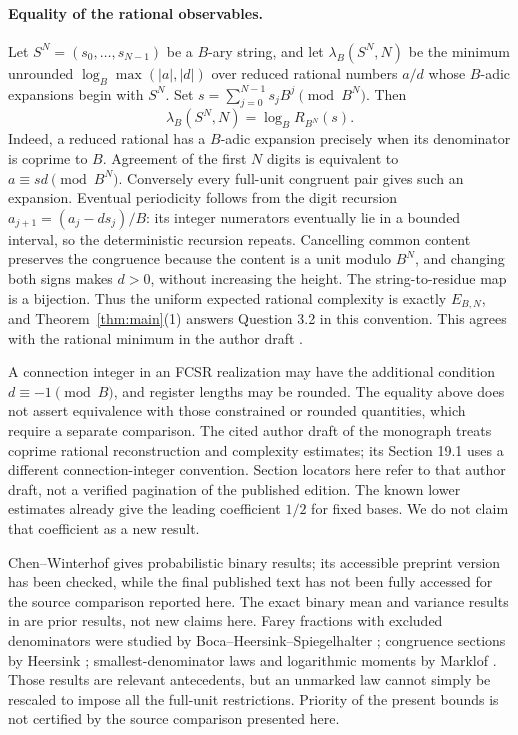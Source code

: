 \documentclass[11pt]{article}
\theoremstyle{definition}\newtheorem{definition}[theorem]{Definition}
\theoremstyle{remark}\newtheorem{remark}[theorem]{Remark}
\begin{document}
\paragraph{Equality of the rational observables.}
Let \(S^N=(s_0,\ldots,s_{N-1})\) be a \(B\)-ary string, and let
\(\lambda_B(S^N,N)\) be the minimum unrounded \(\log_B\max(|a|,|d|)\)
over reduced rational numbers \(a/d\) whose \(B\)-adic expansions begin
with \(S^N\). Set \(s=\sum_{j=0}^{N-1}s_jB^j\pmod{B^N}\).
Then
\[
 \lambda_B(S^N,N)=\log_B R_{B^N}(s).
\]
Indeed, a reduced rational has a \(B\)-adic expansion precisely when its
denominator is coprime to \(B\). Agreement of the first \(N\) digits is equivalent to
\(a\equiv sd\pmod{B^N}\). Conversely every full-unit congruent pair gives
such an expansion. Eventual periodicity follows from the digit recursion
\(a_{j+1}=(a_j-ds_j)/B\): its integer numerators eventually lie in a
bounded interval, so the deterministic recursion repeats.
Cancelling common content preserves the congruence
because the content is a unit modulo \(B^N\), and changing both signs makes
\(d>0\), without increasing the height. The string-to-residue map is a
bijection. Thus the uniform expected rational complexity is exactly
\(E_{B,N}\), and Theorem~\ref{thm:main}(1) answers Question 3.2 in this
convention. This agrees with the rational minimum in the author draft
\cite[Section 21.5]{GK}.

A connection integer in an FCSR realization may have the additional
condition \(d\equiv-1\pmod B\), and register lengths may be rounded.
The equality above does not assert equivalence with those constrained
or rounded quantities, which require a separate comparison.
The cited author draft of the monograph \cite[Sections 19.3,21.3,21.5]{GK}
treats coprime rational reconstruction and complexity estimates; its
Section 19.1 uses a different connection-integer convention.
Section locators here refer to that author draft, not a verified
pagination of the published edition. The known lower estimates already
give the leading coefficient \(1/2\) for fixed bases. We do not claim that
coefficient as a new result.

Chen--Winterhof \cite{CW} gives probabilistic binary results; its accessible
preprint version has been checked, while the final published text has not
been fully accessed for the source comparison reported here. The exact binary mean and
variance results in \cite{binary} are prior results, not new claims here.
Farey fractions with excluded denominators were studied by
Boca--Heersink--Spiegelhalter \cite{BHS}; congruence sections by
Heersink \cite{Heersink}; smallest-denominator laws and logarithmic
moments by Marklof \cite{Marklof,MarklofLog}. Those results are relevant
antecedents, but an unmarked law cannot simply be rescaled to impose all
the full-unit restrictions. Priority of the present bounds is not certified
by the source comparison presented here.
\end{document}

